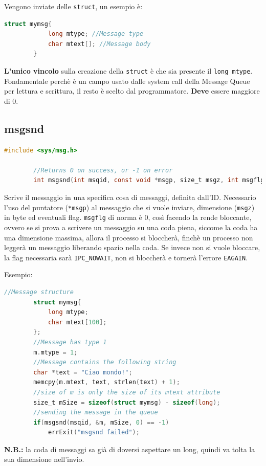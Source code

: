 \documentclass[a4paper, 12pt]{book}
\begin{document}
    Vengono inviate delle \verb|struct|, un esempio è:
    \begin{lstlisting}[language=C]
        struct mymsg{
            long mtype; //Message type 
            char mtext[]; //Message body 
        }
    \end{lstlisting}
    \textbf{L'unico vincolo} sulla creazione della 
    \verb|struct| è che sia presente il 
    \verb|long mtype|. Fondamentale perchè è un campo 
    usato dalle system call della Message Queue per lettura 
    e scrittura, il resto è scelto dal programmatore. 
    \textbf{Deve} essere maggiore di 0.

    \subsection{msgsnd}

    \begin{lstlisting}[language=C]
        #include <sys/msg.h>

        //Returns 0 on success, or -1 on error 
        int msgsnd(int msqid, const void *msgp, size_t msgz, int msgflg);
    \end{lstlisting}
    Scrive il messaggio in una specifica cosa di messaggi, 
    definita dall'ID. Necessario l'uso del puntatore (\verb|*msgp|)
    al messaggio che si vuole inviare, dimensione (\verb|msgz|) 
    in byte ed eventuali flag. \verb|msgflg| di norma 
    è 0, così facendo la rende bloccante, ovvero se si 
    prova a scrivere un messaggio su una coda piena, siccome 
    la coda ha una dimensione massima, allora il processo 
    si bloccherà, finchè un processo non leggerà un messaggio 
    liberando spazio nella coda. Se invece non si vuole 
    bloccare, la flag necessaria sarà \verb|IPC_NOWAIT|,
    non si bloccherà e tornerà l'errore \verb|EAGAIN|.

    Esempio:
    \begin{lstlisting}[language=C]
        //Message structure 
        struct mymsg{
            long mtype; 
            char mtext[100]; 
        };
        //Message has type 1
        m.mtype = 1;
        //Message contains the following string 
        char *text = "Ciao mondo!";
        memcpy(m.mtext, text, strlen(text) + 1);
        //size of m is only the size of its mtext attribute 
        size_t mSize = sizeof(struct mymsg) - sizeof(long);
        //sending the message in the queue 
        if(msgsnd(msqid, &m, mSize, 0) == -1)
            errExit("msgsnd failed");
    \end{lstlisting}
    \textbf{N.B.:} la coda di messaggi sa già di doversi 
    aspettare un long, quindi va tolta la sua dimensione 
    nell'invio.
\end{document}
